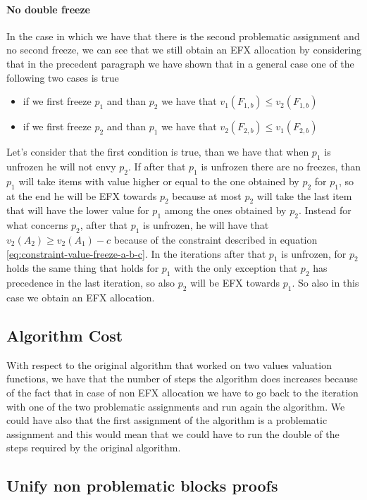 \documentclass{article}
\begin{document}
\paragraph{No double freeze} In the case in which we have that there is the second problematic assignment and no second freeze, we can see that we still obtain an EFX allocation by considering that in the precedent paragraph we have shown that in a general case one of the following two cases is true
\begin{itemize}
    \item if we first freeze $p_1$ and than $p_2$ we have that $v_1(F_{1,b})\le v_2(F_{1,b})$
    \item if we first freeze $p_2$ and than $p_1$ we have that $v_2(F_{2,b})\le v_1(F_{2,b})$
\end{itemize}
Let's consider that the first condition is true, than we have that when $p_1$ is unfrozen he will not envy $p_2$. If after that $p_1$ is unfrozen there are no freezes, than $p_1$ will take items with value higher or equal to the one obtained by $p_2$ for $p_1$, so at the end he will be EFX towards $p_2$ because at most $p_2$ will take the last item that will have the lower value for $p_1$ among the ones obtained by $p_2$. Instead for what concerns $p_2$, after that $p_1$ is unfrozen, he will have that $v_2(A_2) \ge v_2(A_1) - c$ because of the constraint described in equation \ref{eq:constraint-value-freeze-a-b-c}. In the iterations after that $p_1$ is unfrozen, for $p_2$ holds the same thing that holds for $p_1$ with the only exception that $p_2$ has precedence in the last iteration, so also $p_2$ will be EFX towards $p_1$. So also in this case we obtain an EFX allocation.

\subsection{Algorithm Cost}
With respect to the original algorithm that worked on two values valuation functions, we have that the number of steps the algorithm does increases because of the fact that in case of non EFX allocation we have to go back to the iteration with one of the two problematic assignments and run again the algorithm. We could have also that the first assignment of the algorithm is a problematic assignment and this would mean that we could have to run the double of the steps required by the original algorithm. 

\subsection{Unify non problematic blocks proofs}
\end{document}
